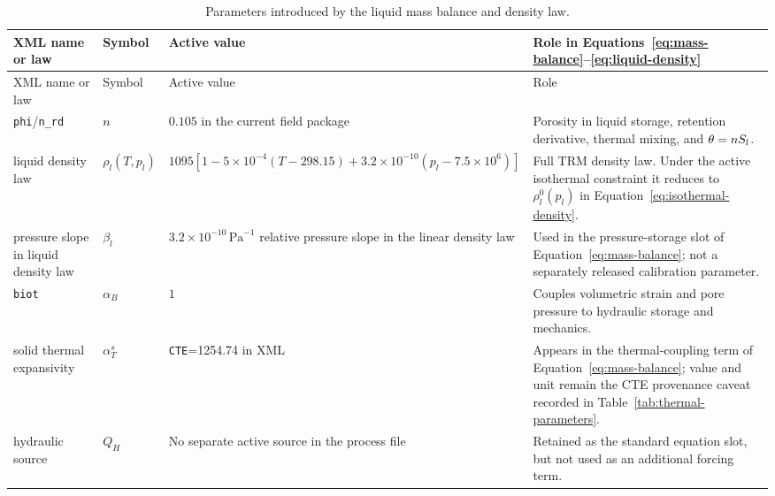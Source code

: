 \begingroup
\small
\setlength{\tabcolsep}{3pt}
\begin{longtable}{@{}L{0.20\textwidth} L{0.16\textwidth} L{0.25\textwidth} L{0.29\textwidth}@{}}
\caption{Parameters introduced by the liquid mass balance and density law.}
\label{tab:liquid-mass-parameters}\\
\toprule
XML name or law & Symbol & Active value & Role in Equations~\eqref{eq:mass-balance}--\eqref{eq:liquid-density}\\
\midrule
\endfirsthead
\toprule
XML name or law & Symbol & Active value & Role\\
\midrule
\endhead
\bottomrule
\endlastfoot
\texttt{phi}/\texttt{n\_rd} & \(n\) &
\(0.105\) in the current field package &
Porosity in liquid storage, retention derivative, thermal mixing, and
\(\theta=n S_l\).\\
liquid density law & \(\rho_l(T,p_l)\) &
\(1095[1-5\times10^{-4}(T-298.15)+3.2\times10^{-10}(p_l-7.5\times10^6)]\) &
Full TRM density law.  Under the active isothermal constraint it reduces to
\(\rho_l^0(p_l)\) in Equation~\eqref{eq:isothermal-density}.\\
pressure slope in liquid density law & \(\beta_l\) &
\(3.2\times10^{-10}\,\mathrm{Pa}^{-1}\) relative pressure slope in the linear density law &
Used in the pressure-storage slot of Equation~\eqref{eq:mass-balance}; not a
separately released calibration parameter.\\
\texttt{biot} & \(\alpha_B\) &
\(1\) &
Couples volumetric strain and pore pressure to hydraulic storage and mechanics.\\
solid thermal expansivity & \(\alpha_T^s\) &
\texttt{CTE}=1254.74 in XML &
Appears in the thermal-coupling term of Equation~\eqref{eq:mass-balance}; value and
unit remain the CTE provenance caveat recorded in Table~\ref{tab:thermal-parameters}.\\
hydraulic source & \(Q_H\) &
No separate active source in the process file &
Retained as the standard equation slot, but not used as an additional forcing term.\\
\end{longtable}
\endgroup
